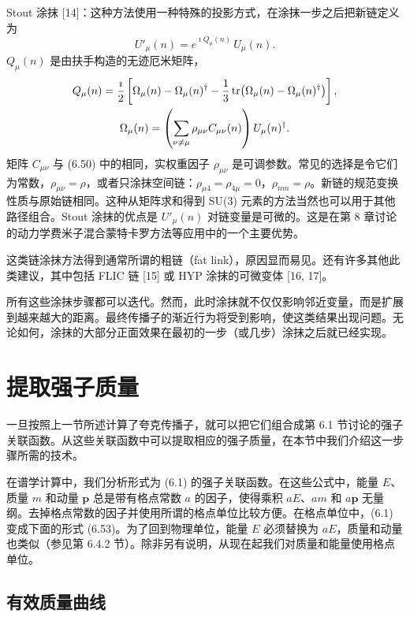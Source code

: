 Stout 涂抹 [14]：这种方法使用一种特殊的投影方式，在涂抹一步之后把新链定义为
\begin{equation}
  U'_\mu(n) = e^{\imath Q_\mu(n)}\, U_\mu(n) .
\end{equation}
$Q_\mu(n)$ 是由扶手构造的无迹厄米矩阵，
\begin{equation}
  \begin{gathered}
    Q_\mu(n) = \frac{\imath}{2}\left[ \Omega_\mu(n) - \Omega_\mu(n)^\dagger
      - \frac{1}{3}\operatorname{tr}\!\left( \Omega_\mu(n) - \Omega_\mu(n)^\dagger \right)
      \right], \\
    \Omega_\mu(n) = \left( \sum_{\nu\neq\mu} \rho_{\mu\nu} C_{\mu\nu}(n)
      \right) U_\mu(n)^\dagger .
  \end{gathered}
\end{equation}
矩阵 $C_{\mu\nu}$ 与 (6.50) 中的相同，实权重因子 $\rho_{\mu\nu}$ 是可调参数。常见的选择是令它们为常数，$\rho_{\mu\nu} = \rho$，或者只涂抹空间链：$\rho_{\mu 4} = \rho_{4\mu} = 0$，$\rho_{nm} = \rho$。新链的规范变换性质与原始链相同。这种从矩阵求和得到 SU(3) 元素的方法当然也可以用于其他路径组合。Stout 涂抹的优点是 $U'_\mu(n)$ 对链变量是可微的。这是在第 8 章讨论的动力学费米子混合蒙特卡罗方法等应用中的一个主要优势。

这类链涂抹方法得到通常所谓的粗链（fat link），原因显而易见。还有许多其他此类建议，其中包括 FLIC 链 [15] 或 HYP 涂抹的可微变体 [16, 17]。

所有这些涂抹步骤都可以迭代。然而，此时涂抹就不仅仅影响邻近变量，而是扩展到越来越大的距离。最终传播子的渐近行为将受到影响，使这类结果出现问题。无论如何，涂抹的大部分正面效果在最初的一步（或几步）涂抹之后就已经实现。

\section{提取强子质量}

一旦按照上一节所述计算了夸克传播子，就可以把它们组合成第 6.1 节讨论的强子关联函数。从这些关联函数中可以提取相应的强子质量，在本节中我们介绍这一步骤所需的技术。

在谱学计算中，我们分析形式为 (6.1) 的强子关联函数。在这些公式中，能量 $E$、质量 $m$ 和动量 $\mathbf{p}$ 总是带有格点常数 $a$ 的因子，使得乘积 $aE$、$am$ 和 $a\mathbf{p}$ 无量纲。去掉格点常数的因子并使用所谓的格点单位比较方便。在格点单位中，(6.1) 变成下面的形式 (6.53)。为了回到物理单位，能量 $E$ 必须替换为 $aE$，质量和动量也类似（参见第 6.4.2 节）。除非另有说明，从现在起我们对质量和能量使用格点单位。

\subsection{有效质量曲线}

